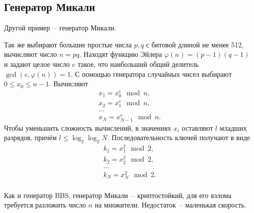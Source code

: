 \subsection{Генератор Микали}

Другой пример~-- генератор Микали.

Так же выбирают большие простые числа $p,q$ с битовой длиной не менее 512, вычисляют число $n = pq$. Находят функцию Эйлера $\varphi(n) = (p-1) (q-1)$ и задают целое число $e$ такое, что наибольший общий делитель $\gcd(e, \varphi(n)) = 1$. С помощью генератора случайных чисел выбирают $0 \leq x_{0} \leq n-1$. Вычисляют
\[ \begin{array}{l}
    x_1 = x_0^e \mod n, \\
    x_2 = x_1^e \mod n, \\
    \dots \\
    x_N = x_{N-1}^e \mod n.
\end{array} \]
Чтобы уменьшить сложность вычислений, в значениях $x_i$ оставляют $l$ младших разрядов, причём $l \leq \log_2 \log_2 N$. Последовательность ключей получают в виде
\[ \begin{array}{l}
    k_1 = x_1^2 \mod 2, \\
    k_2 = x_2^2 \mod 2, \\
    \dots \\
    k_N = x_N^2 \mod 2. \\
\end{array} \]

Как и генератор BBS, генератор Микали~-- криптостойкий, для его взлома требуется разложить число $n$ на множители. Недостаток~-- маленькая скорость.
